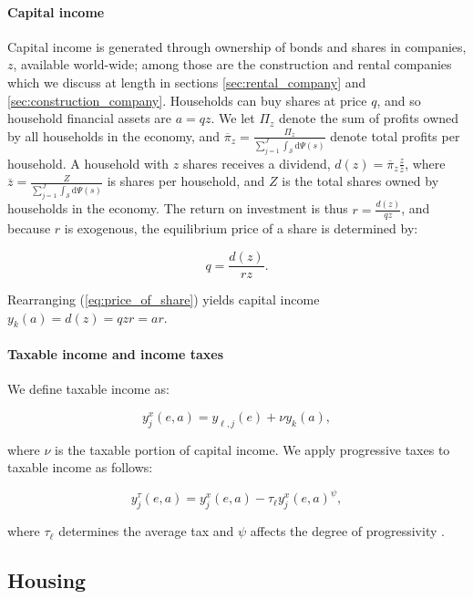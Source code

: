 \documentclass[parskip=full]{article}
\begin{document}
\paragraph{Capital income} Capital income is generated through ownership of bonds and shares in companies, $z$, available world-wide; among those are the construction and rental companies which we discuss at length in sections \ref{sec:rental_company} and \ref{sec:construction_company}. Households can buy shares at price $q$, and so household financial assets are $a=qz$. We let $\Pi_{z}$ denote the sum of profits owned by all households in the economy, and $\overline{\pi}_{z}=\frac{\Pi_{z}}{\sum_{j=1}^J \int_\mathcal{S} \mathrm{d}\Psi(s)}$ denote total profits per household. A household with $z$ shares receives a dividend, $d(z)=\overline{\pi}_{z}\frac{z}{\overline{z}}$, where $\overline{z}=\frac{Z}{\sum_{j=1}^J \int_\mathcal{S} \mathrm{d}\Psi(s)}$ is shares per household, and $Z$ is the total shares owned by households in the economy. The return on investment is thus $r=\frac{d(z)}{qz}$, and because $r$ is exogenous, the equilibrium price of a share is determined by:

\begin{equation}\label{eq:price_of_share}
  q =\frac{d(z)}{rz}.
\end{equation}

\noindent Rearranging (\ref{eq:price_of_share}) yields capital income $y_{k}(a)=d(z)=qzr=ar$. 

\paragraph{Taxable income and income taxes} We define taxable income as:

\begin{equation*}\label{eq:taxable_labor_income}
  y^{x}_{j}(e,a) =y_{\ell,j}(e)+\nu y_{k}(a),
\end{equation*}

\noindent where $\nu$ is the taxable portion of capital income. We apply progressive taxes to taxable income as follows:

\begin{equation}\label{eq:income_tax}
  y^{\tau}_{j}(e,a) = y^{x}_{j}(e,a)-\tau_{\ell}y^{x}_{j}(e,a)^{\psi},
\end{equation}

\noindent where $\tau_{\ell}$ determines the average tax and $\psi$ affects the degree of progressivity \citep{hsv-2020}.

\subsection{Housing}\label{subsection:housing_choice}
\end{document}
